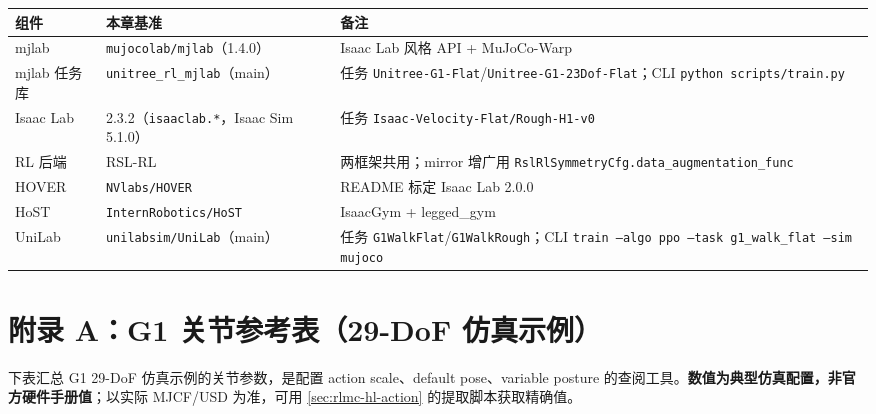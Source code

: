 \begin{center}
\small
\begin{tabular}{p{3.4cm}p{4.0cm}p{5.2cm}}
\hline
组件 & 本章基准 & 备注 \\
\hline
mjlab & \texttt{mujocolab/\allowbreak mjlab}（1.4.0） & Isaac Lab 风格 API + MuJoCo-Warp\cite{mjlab2026} \\
mjlab 任务库 & \texttt{unitree\_rl\_mjlab}（main） & 任务 \texttt{Unitree-G1-Flat}/\allowbreak\texttt{Unitree-G1-23Dof-Flat}；CLI \texttt{python scripts/\allowbreak train.\allowbreak py} \\
Isaac Lab & 2.3.2（\texttt{isaaclab.*}，Isaac Sim 5.1.0） & 任务 \texttt{Isaac-Velocity-Flat/\allowbreak Rough-H1-v0} \\
RL 后端 & RSL-RL & 两框架共用；mirror 增广用 \texttt{RslRlSymmetryCfg.\allowbreak data\_augmentation\_func} \\
HOVER & \texttt{NVlabs/\allowbreak HOVER} & README 标定 Isaac Lab 2.0.0 \\
HoST & \texttt{InternRobotics/\allowbreak HoST} & IsaacGym + legged\_gym \\
UniLab & \texttt{unilabsim/\allowbreak UniLab}（main） & 任务 \texttt{G1WalkFlat}/\allowbreak\texttt{G1WalkRough}；CLI \texttt{train --algo ppo --task g1\_walk\_flat --sim mujoco}\cite{unilab2026} \\
\hline
\end{tabular}
\end{center}

\section*{附录 A：G1 关节参考表（29-DoF 仿真示例）}

下表汇总 G1 29-DoF 仿真示例的关节参数，是配置 action scale、default pose、variable posture 的查阅工具。\textbf{数值为典型仿真配置，非官方硬件手册值}；以实际 MJCF/USD 为准，可用 \cref{sec:rlmc-hl-action} 的提取脚本获取精确值。

